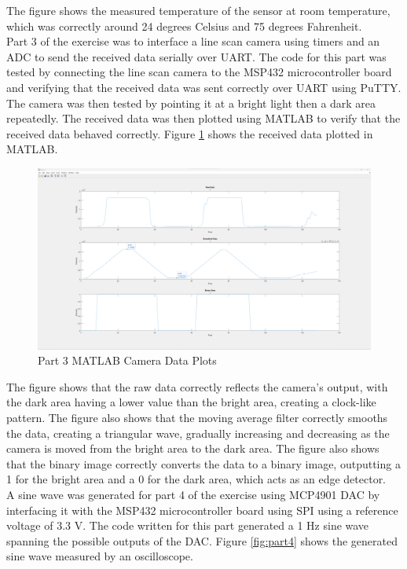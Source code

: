 \documentclass[CMPE]{KGCOEReport}
\begin{document}
The figure shows the measured temperature of the sensor at room temperature, which was correctly around 24 degrees Celsius and 75 degrees Fahrenheit.\\

Part 3 of the exercise was to interface a line scan camera using timers and an ADC to send the received data serially over UART. The code for this part was tested by connecting the line scan camera to the MSP432 microcontroller board and verifying that the received data was sent correctly over UART using PuTTY.\\

The camera was then tested by pointing it at a bright light then a dark area repeatedly. The received data was then plotted using MATLAB to verify that the received data behaved correctly. Figure \ref{fig:part3} shows the received data plotted in MATLAB.

\begin{figure}[H]
    \centering
    \includegraphics[width=1.00\textwidth]{part3.png}
    \caption{Part 3 MATLAB Camera Data Plots}
    \label{fig:part3}
\end{figure}

The figure shows that the raw data correctly reflects the camera's output, with the dark area having a lower value than the bright area, creating a clock-like pattern. The figure also shows that the moving average filter correctly smooths the data, creating a triangular wave, gradually increasing and decreasing as the camera is moved from the bright area to the dark area. The figure also shows that the binary image correctly converts the data to a binary image, outputting a 1 for the bright area and a 0 for the dark area, which acts as an edge detector.\\

A sine wave was generated for part 4 of the exercise using MCP4901 DAC by interfacing it with the MSP432 microcontroller board using SPI using a reference voltage of 3.3 V. The code written for this part generated a 1 Hz sine wave spanning the possible outputs of the DAC. Figure \ref{fig:part4} shows the generated sine wave measured by an oscilloscope.
\end{document}
